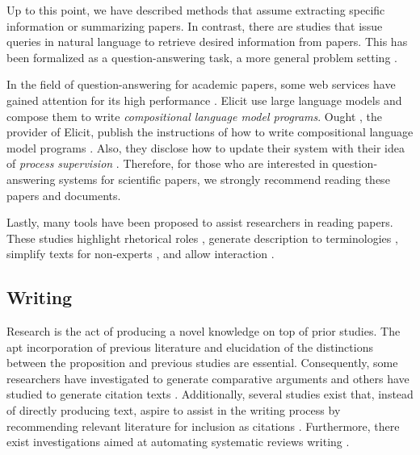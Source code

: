\documentclass{book}
\begin{document}
Up to this point, we have described methods that assume extracting specific information or summarizing papers. In contrast, there are studies that issue queries in natural language to retrieve desired information from papers. This has been formalized as a question-answering task, a more general problem setting \cite{lu2022learn,ruggeri2022argscichat,saikh2022scienceqa}. 

In the field of question-answering for academic papers, some web services have gained attention for its high performance \cite{elicit,scispace}. Elicit use large language models and compose them to write \textit{compositional language model programs}. Ought \cite{ought}, the provider of Elicit, publish the instructions of how to write compositional language model programs \cite{primer2022}. Also, they disclose how to update their system with their idea of \textit{process supervision} \cite{reppert2023iterated}. Therefore, for those who are interested in question-answering systems for scientific papers, we strongly recommend reading these papers and documents.

Lastly, many tools have been proposed to assist researchers in reading papers. These studies highlight rhetorical roles \cite{fok2023scim,lauscher2018arguminsci}, generate description to terminologies \cite{august2022generating,head2021augmenting,murthy2022accord}, simplify texts for non-experts \cite{august2022paper,jeblick2022chatgpt}, and allow interaction \cite{kang2022threddy,elicit,scispace}.

\subsection{Writing}
Research is the act of producing a novel knowledge on top of prior studies. The apt incorporation of previous literature and elucidation of the distinctions between the proposition and previous studies are essential. Consequently, some researchers have investigated to generate comparative arguments \cite{yu2022scientific} and others have studied to generate citation texts \cite{arita2022citation,gu2022controllable,wang2021autocite,xing2020automatic,funkquist2022citebench}. Additionally, several studies exist that, instead of directly producing text, aspire to assist in the writing process by recommending relevant literature for inclusion as citations \cite{farber2020citation,zhang2020dual,duma2019contextual,farber2018cite,gosangi2021use}. Furthermore, there exist investigations aimed at automating systematic reviews writing \cite{dones2022systematic}.
\end{document}

